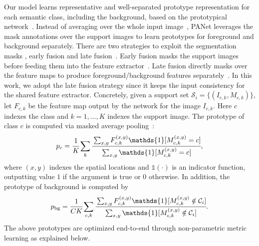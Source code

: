 \documentclass[10pt,twocolumn,letterpaper]{article}
\begin{document}
Our model learns representative and well-separated prototype representation for each semantic class, including the background, based on the prototypical network~\cite{snell2017prototypical}. Instead of averaging over the whole input image~\cite{snell2017prototypical}, PANet leverages the mask annotations over the support images to learn prototypes for foreground and background separately. There are two strategies to exploit the segmentation masks \ie, early fusion and late fusion~\cite{rakelly2018few}. Early fusion masks the support images before feeding them into the feature extractor~\cite{shaban2017one,Hu2018AttentionbasedMG,dong2018few}. Late fusion directly masks over the feature maps to produce foreground/background features separately~\cite{zhang2018sg, rakelly2018conditional}. In this work, we adopt the late fusion strategy since it keeps the input consistency for the shared feature extractor. Concretely, given a support set $\mathcal{S}_i=\{(I_{c,k}, M_{c,k})\}$, let $F_{c,k}$ be the feature map output by the network for the image $I_{c,k}$. Here $c$ indexes the class and $k=1,\ldots,K$ indexes the support image. The prototype of class $c$ is computed via masked average pooling~\cite{zhang2018sg}:
\begin{equation}
\label{eqn:prototype_fg}
    p_c = \cfrac{1}{K} \sum_{k} \cfrac{\sum_{x,y} F_{c,k}^{(x,y)} \mathds{1}[M_{c,k}^{(x,y)}=c]}{\sum_{x,y} \mathds{1}[M_{c,k}^{(x,y)}=c]},
\end{equation}
where  $(x,y)$ indexes the spatial locations and $\mathds{1}(\cdot)$ is an indicator function, outputting value $1$ if the argument is true or $0$ otherwise.
In addition, the prototype of background is computed by
\begin{equation}
\label{eqn:prototype_bg}
    p_{\text{bg}} = \cfrac{1}{CK}\sum_{c,k} \cfrac{\sum_{x,y} F_{c,k}^{(x,y)} \mathds{1}[M_{c,k}^{(x,y)}\notin\mathcal{C}_i]}{\sum_{x,y} \mathds{1}[M_{c,k}^{(x,y)}\notin\mathcal{C}_i]}.
\end{equation}
The above prototypes are optimized end-to-end through non-parametric metric learning as explained below.
\end{document}
